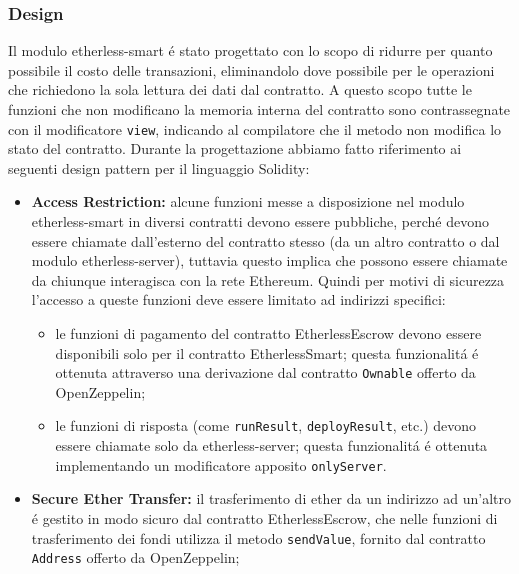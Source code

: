 \subsubsection{Design}
  Il modulo etherless-smart é stato progettato con lo scopo di ridurre per quanto possibile il costo delle transazioni, eliminandolo dove possibile per le operazioni che richiedono la sola lettura dei dati dal contratto. A questo scopo tutte le funzioni che non modificano la memoria interna del contratto sono contrassegnate con il modificatore \texttt{view}, indicando al compilatore che il metodo non modifica lo stato del contratto.
  Durante la progettazione abbiamo fatto riferimento ai seguenti design pattern per il linguaggio Solidity:
  \begin{itemize}
    \item \textbf{Access Restriction:} alcune funzioni messe a disposizione nel modulo etherless-smart in diversi contratti devono essere pubbliche, perché devono essere chiamate dall'esterno del contratto stesso (da un altro contratto o dal modulo etherless-server), tuttavia questo implica che possono essere chiamate da chiunque interagisca con la rete Ethereum. Quindi per motivi di sicurezza l'accesso a queste funzioni deve essere limitato ad indirizzi specifici:
      \begin{itemize}
        \item le funzioni di pagamento del contratto EtherlessEscrow devono essere disponibili solo per il contratto EtherlessSmart; questa funzionalitá é ottenuta attraverso una derivazione dal contratto \texttt{Ownable} offerto da OpenZeppelin;
        \item le funzioni di risposta (come \texttt{runResult}, \texttt{deployResult}, etc.) devono essere chiamate solo da etherless-server; questa funzionalitá é ottenuta implementando un modificatore apposito \texttt{onlyServer}.
      \end{itemize}
    \item \textbf{Secure Ether Transfer:} il trasferimento di ether da un indirizzo ad un'altro é gestito in modo sicuro dal contratto EtherlessEscrow, che nelle funzioni di trasferimento dei fondi utilizza il metodo \texttt{sendValue}, fornito dal contratto \texttt{Address} offerto da OpenZeppelin;


\end{itemize}
